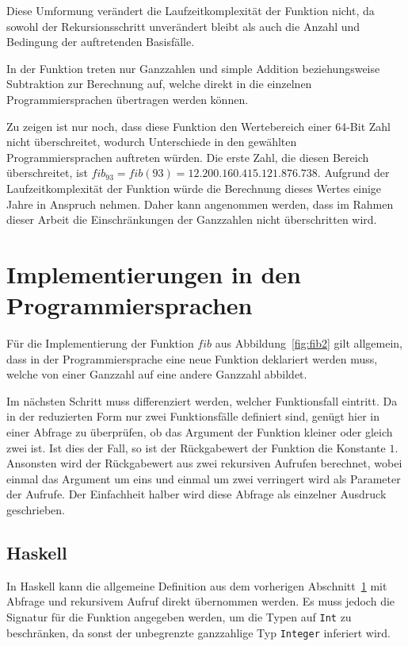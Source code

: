 \documentclass[11pt, parskip=half]{scrartcl}       %
\begin{document}
Diese Umformung verändert die Laufzeitkomplexität der Funktion nicht, da sowohl der Rekursionsschritt unverändert bleibt als auch die Anzahl und Bedingung der auftretenden Basisfälle.

In der Funktion treten nur Ganzzahlen und simple Addition beziehungsweise Subtraktion zur Berechnung auf, welche direkt in die einzelnen Programmiersprachen übertragen werden können.

Zu zeigen ist nur noch, dass diese Funktion den Wertebereich einer 64-Bit Zahl nicht überschreitet, wodurch Unterschiede in den gewählten Programmiersprachen auftreten würden.
Die erste Zahl, die diesen Bereich überschreitet, ist $fib_{93} = fib(93) = 12.200.160.415.121.876.738$.
Aufgrund der Laufzeitkomplexität der Funktion würde die Berechnung dieses Wertes einige Jahre in Anspruch nehmen.\cite{aud_landau}
Daher kann angenommen werden, dass im Rahmen dieser Arbeit die Einschränkungen der Ganzzahlen nicht überschritten wird. 


\section{Implementierungen in den Programmiersprachen}
\label{def-fib}

Für die Implementierung der Funktion $fib$ aus Abbildung~\ref{fig:fib2} gilt allgemein, dass in der Programmiersprache eine neue Funktion deklariert werden muss, welche von einer Ganzzahl auf eine andere Ganzzahl abbildet.

Im nächsten Schritt muss differenziert werden, welcher Funktionsfall eintritt.
Da in der reduzierten Form nur zwei Funktionsfälle definiert sind, genügt hier in einer Abfrage zu überprüfen, ob  das Argument der Funktion kleiner oder gleich zwei ist.
Ist dies der Fall, so ist der Rückgabewert der Funktion die Konstante $1$.
Ansonsten wird der Rückgabewert aus zwei rekursiven Aufrufen berechnet, wobei einmal das Argument um eins und einmal um zwei verringert wird als Parameter der Aufrufe.
Der Einfachheit halber wird diese Abfrage als einzelner Ausdruck geschrieben.

\subsection{Haskell}

In Haskell kann die allgemeine Definition aus dem vorherigen Abschnitt~\ref{def-fib} mit Abfrage und rekursivem Aufruf direkt übernommen werden.
Es muss jedoch die Signatur für die Funktion angegeben werden, um die Typen auf \texttt{Int} zu beschränken, da sonst der unbegrenzte ganzzahlige Typ \texttt{Integer} inferiert wird.
\end{document}
